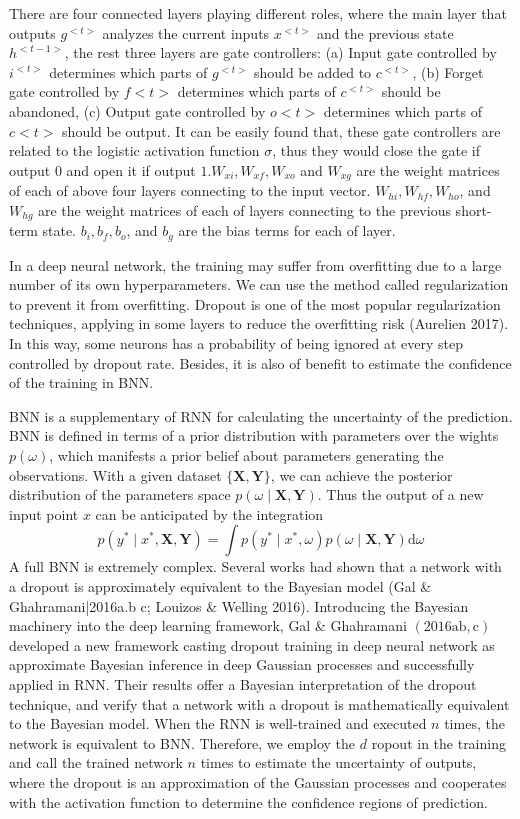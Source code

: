 There are four connected layers playing different roles, where the main layer that outputs $g^{<t>}$ analyzes the current inputs $x^{<t>}$ and the previous state $h^{<t-1>}$, the rest three layers are gate controllers: (a) Input gate controlled by $i^{<t>}$ determines which parts of $g^{<t>}$ should be added to $c^{<t>}$, (b) Forget gate controlled by $f<t>$ determines which parts of $c^{<t>}$ should be abandoned, (c) Output gate controlled by $o<t>$ determines which parts of $c<t>$ should be output. It can be easily found that, these gate controllers are related to the logistic activation function $\sigma$, thus they would close the gate if output 0 and open it if output $1 . W_{x i}, W_{x f}, W_{x o}$ and $W_{x g}$ are the weight matrices of each of above four layers connecting to the input vector. $W_{h i}, W_{h f}, W_{h o}$, and $W_{h g}$ are the weight matrices of each of layers connecting to the previous short-term state. $b_{i}, b_{f}, b_{o}$, and $b_{g}$ are the bias terms for each of layer.

In a deep neural network, the training may suffer from overfitting due to a large number of its own hyperparameters. We can use the method called regularization to prevent it from overfitting. Dropout is one of the most popular regularization techniques, applying in some layers to reduce the overfitting risk (Aurelien 2017). In this way, some neurons has a probability of being ignored at every step controlled by dropout rate. Besides, it is also of benefit to estimate the confidence of the training in BNN.

BNN is a supplementary of RNN for calculating the uncertainty of the prediction. BNN is defined in terms of a prior distribution with parameters over the wights $p(\omega)$, which manifests a prior belief about parameters generating the observations. With a given dataset $\{\mathbf{X}, \mathbf{Y}\}$, we can achieve the posterior distribution of the parameters space $p(\omega \mid \mathbf{X}, \mathbf{Y})$. Thus the output of a new input point $x$ can be anticipated by the integration
$$
p\left(y^{*} \mid x^{*}, \mathbf{X}, \mathbf{Y}\right)=\int p\left(y^{*} \mid x^{*}, \omega\right) p(\omega \mid \mathbf{X}, \mathbf{Y}) \mathrm{d} \omega
$$
A full BNN is extremely complex. Several works had shown that a network with a dropout is approximately equivalent to the Bayesian model (Gal \& Ghahramani|2016a.b c; Louizos \& Welling 2016). Introducing the Bayesian machinery into the deep learning framework, Gal \& Ghahramani $(2016 \mathrm{a} \mathrm{b}, \mathrm{c})$ developed a new framework casting dropout training in deep neural network as approximate Bayesian inference in deep Gaussian processes and successfully applied in RNN. Their results offer a Bayesian interpretation of the dropout technique, and verify that a network with a dropout is mathematically equivalent to the Bayesian model. When the RNN is well-trained and executed $n$ times, the network is equivalent to BNN. Therefore, we employ the $d$ ropout in the training and call the trained network $n$ times to estimate the uncertainty of outputs, where the dropout is an approximation of the Gaussian processes and cooperates with the activation function to determine the confidence regions of prediction.